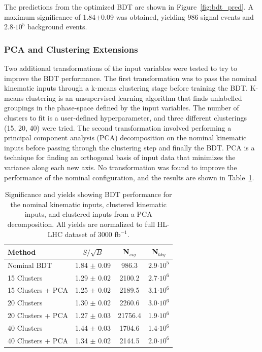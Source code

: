 The predictions from the optimized BDT are shown in Figure~\ref{fig:bdt_pred}. A maximum significance of 1.84$\pm$0.09 was obtained, yielding 986 signal events and 2.8$\cdot 10^5$ background events. 

\subsubsection{PCA and Clustering Extensions}
Two additional transformations of the input variables were tested to try to improve the BDT performance. The first transformation was to pass the nominal kinematic inputs through a k-means clustering stage before training the BDT. K-means clustering is an unsupervised learning algorithm that finds unlabelled groupings in the phase-space defined by the input variables. The number of clusters to fit is a user-defined hyperparameter, and three different clusterings (15, 20, 40) were tried. The second transformation involved performing a principal component analysis (PCA) decomposition on the nominal kinematic inputs before passing through the clustering step and finally the BDT. PCA is a technique for finding an orthogonal basis of input data that minimizes the variance along each new axis. No transformation was found to improve the performance of the nominal configuration, and the results are shown in Table~\ref{tab:bdtPCACluster}.

\begin{table}[h!]
\label{tab:bdtPCACluster}
\begin{center}
    \begin{tabular}{|l|c|c|c|} %
      \hline\hline
      \textbf{Method} & $S/\sqrt{B}$ & N$_{sig}$ & N$_{bkg}$ \\
      \hline
      Nominal BDT & 1.84 $\pm$ 0.09 & 986.3  & 2.9$\cdot 10^5$ \\
      15 Clusters & 1.29 $\pm$ 0.02 & 2100.2 & 2.7$\cdot 10^6$ \\
      15 Clusters + PCA & 1.25 $\pm$ 0.02 & 2189.5 & 3.1$\cdot 10^6$ \\         
      20 Clusters & 1.30 $\pm$ 0.02 & 2260.6 & 3.0$\cdot 10^6$ \\
      20 Clusters + PCA & 1.27 $\pm$ 0.03 & 21756.4 & 1.9$\cdot 10^6$ \\         
      40 Clusters & 1.44 $\pm$ 0.03 & 1704.6 & 1.4$\cdot 10^6$ \\
      40 Clusters + PCA & 1.34 $\pm$ 0.02 & 2144.5 & 2.0$\cdot 10^6$ \\         
      \hline\hline
    \end{tabular}
    \caption{Significance and yields showing BDT performance for the nominal kinematic inputs, clustered kinematic inputs, and clustered inputs from a PCA decomposition. All yields are normalized to full HL-LHC dataset of 3000 fb$^{-1}$.}
    \end{center}
\end{table}



